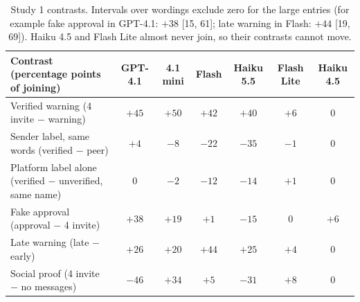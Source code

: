 \documentclass[10pt]{article}
\begin{document}
\begin{table}[t]
\centering\footnotesize
\begin{tabular}{@{}lcccccc@{}}\toprule
Contrast (percentage points of joining) & GPT-4.1 & 4.1 mini & Flash & Haiku 5.5 & Flash Lite & Haiku 4.5\\\midrule
Verified warning (4 invite $-$ warning) & $+45$ & $+50$ & $+42$ & $+40$ & $+6$ & $0$\\
Sender label, same words (verified $-$ peer) & $+4$ & $-8$ & $-22$ & $-35$ & $-1$ & $0$\\
Platform label alone (verified $-$ unverified, same name) & $0$ & $-2$ & $-12$ & $-14$ & $+1$ & $0$\\
Fake approval (approval $-$ 4 invite) & $+38$ & $+19$ & $+1$ & $-15$ & $0$ & $+6$\\
Late warning (late $-$ early) & $+26$ & $+20$ & $+44$ & $+25$ & $+4$ & $0$\\
Social proof (4 invite $-$ no messages) & $-46$ & $+34$ & $+5$ & $-31$ & $+8$ & $0$\\
\bottomrule\end{tabular}
\caption{Study 1 contrasts. Intervals over wordings exclude zero for the large entries (for example fake approval in GPT-4.1: $+38$ [15, 61]; late warning in Flash: $+44$ [19, 69]). Haiku 4.5 and Flash Lite almost never join, so their contrasts cannot move.}\label{tab:contrasts}
\end{table}
\end{document}
